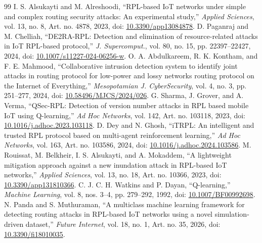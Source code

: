 \documentclass[journal]{IEEEtran}
\begin{document}
\begin{thebibliography}{99}
 I. S. Alsukayti and M. Alreshoodi, ``RPL-based IoT networks under simple and complex routing security attacks: An experimental study,'' \emph{Applied Sciences}, vol. 13, no. 8, Art. no. 4878, 2023, doi: \href{https://doi.org/10.3390/app13084878}{10.3390/app13084878}.
 D. Paganraj and M. Chelliah, ``DE2RA-RPL: Detection and elimination of resource-related attacks in IoT RPL-based protocol,'' \emph{J. Supercomput.}, vol. 80, no. 15, pp. 22397--22427, 2024, doi: \href{https://doi.org/10.1007/s11227-024-06256-w}{10.1007/s11227-024-06256-w}.
 O. A. Abdulkareem, R. K. Kontham, and F. E. Mahmood, ``Collaborative intrusion detection system to identify joint attacks in routing protocol for low-power and lossy networks routing protocol on the Internet of Everything,'' \emph{Mesopotamian J. CyberSecurity}, vol. 4, no. 3, pp. 251--277, 2024, doi: \href{https://doi.org/10.58496/MJCS/2024/026}{10.58496/MJCS/2024/026}.
 G. Sharma, J. Grover, and A. Verma, ``QSec-RPL: Detection of version number attacks in RPL based mobile IoT using Q-learning,'' \emph{Ad Hoc Networks}, vol. 142, Art. no. 103118, 2023, doi: \href{https://doi.org/10.1016/j.adhoc.2023.103118}{10.1016/j.adhoc.2023.103118}.
 D. Dey and N. Ghosh, ``iTRPL: An intelligent and trusted RPL protocol based on multi-agent reinforcement learning,'' \emph{Ad Hoc Networks}, vol. 163, Art. no. 103586, 2024, doi: \href{https://doi.org/10.1016/j.adhoc.2024.103586}{10.1016/j.adhoc.2024.103586}.
 M. Rouissat, M. Belkheir, I. S. Alsukayti, and A. Mokaddem, ``A lightweight mitigation approach against a new inundation attack in RPL-based IoT networks,'' \emph{Applied Sciences}, vol. 13, no. 18, Art. no. 10366, 2023, doi: \href{https://doi.org/10.3390/app131810366}{10.3390/app131810366}.
 C. J. C. H. Watkins and P. Dayan, ``Q-learning,'' \emph{Machine Learning}, vol. 8, nos. 3--4, pp. 279--292, 1992, doi: \href{https://doi.org/10.1007/BF00992698}{10.1007/BF00992698}.
 N. Panda and S. Muthuraman, ``A multiclass machine learning framework for detecting routing attacks in RPL-based IoT networks using a novel simulation-driven dataset,'' \emph{Future Internet}, vol. 18, no. 1, Art. no. 35, 2026, doi: \href{https://doi.org/10.3390/fi18010035}{10.3390/fi18010035}.
\end{thebibliography}
\end{document}
